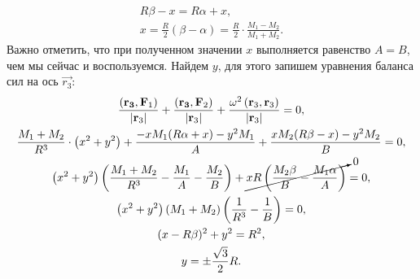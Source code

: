 {{\begin{gather*}
		 R \beta - x = R \alpha + x,\\
		 x = \frac{R}{2} \left( \beta - \alpha \right) = \frac{R}{2} \cdot \frac{M_1 - M_2}{M_1 + M_2}. 
		 \end{gather*}
	Важно отметить, что при полученном значении $x$ выполняется равенство $A = B$, чем мы сейчас и воспользуемся. Найдем $y$, для этого запишем уравнения баланса сил на ось $\vec{r_3}$:
	\begin{gather*}
		\frac{ \left( \vec{r_3},  \vec{F}_1 \right)}{\left| \vec{r}_3 \right|} + \frac{ \left( \vec{r_3}, \vec{F}_2 \right)}{\left| \vec{r}_3\right|} + \frac{\omega^2 \left(\vec{r}_3, \vec{r}_3\right)}{\left| \vec{r}_3\right|} = 0,\\
		\frac{M_1 + M_2}{R^3} \cdot \left( x^2 + y^2 \right) + \frac{-x M_1 (R \alpha + x) - y^2 M_1}{A} + \frac{ x M_2 ( R \beta - x) - y^2 M_2}{B} = 0,\\
		\left( x^2 + y^2 \right) \left(  \frac{M_1 + M_2}{R^3} - \frac{M_1}{A} - \frac{M_2}{B} \right) + \cancelto{0}{xR \left( \frac{M_2 \beta}{B} - \frac{M_1 \alpha}{A} \right)} = 0,\\
		\left( x^2 + y^2 \right)(M_1 + M_2) \left( \frac{1}{R^3} - \frac{1}{B} \right) = 0,\\
		(x - R \beta)^2 + y^2 = R^2,\\
		y = \pm \frac{\sqrt{3}}{2} R.
	\end{gather*}
}
}